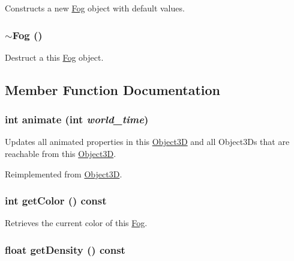 Constructs a new \hyperlink{classm3g_1_1Fog}{Fog} object with default values. \hypertarget{classm3g_1_1Fog_c13d77e65284ed8f7480c8f83ed9780f}{
\subsubsection[{$\sim$Fog}]{\setlength{\rightskip}{0pt plus 5cm}$\sim${\bf Fog} ()}}
\label{classm3g_1_1Fog_c13d77e65284ed8f7480c8f83ed9780f}


Destruct a this \hyperlink{classm3g_1_1Fog}{Fog} object. 

\subsection{Member Function Documentation}
\hypertarget{classm3g_1_1Fog_8aad1ceab4c2a03609c8a42324ce484d}{
\subsubsection[{animate}]{\setlength{\rightskip}{0pt plus 5cm}int animate (int {\em world\_\-time})}}
\label{classm3g_1_1Fog_8aad1ceab4c2a03609c8a42324ce484d}


Updates all animated properties in this \hyperlink{classm3g_1_1Object3D}{Object3D} and all Object3Ds that are reachable from this \hyperlink{classm3g_1_1Object3D}{Object3D}. 

Reimplemented from \hyperlink{classm3g_1_1Object3D_8aad1ceab4c2a03609c8a42324ce484d}{Object3D}.\hypertarget{classm3g_1_1Fog_4cfa1931c265ec3412fe3f6408a1b4f5}{
\subsubsection[{getColor}]{\setlength{\rightskip}{0pt plus 5cm}int getColor () const}}
\label{classm3g_1_1Fog_4cfa1931c265ec3412fe3f6408a1b4f5}


Retrieves the current color of this \hyperlink{classm3g_1_1Fog}{Fog}. \hypertarget{classm3g_1_1Fog_31deef556a6aa5e519d3c79bd9c383c0}{
\subsubsection[{getDensity}]{\setlength{\rightskip}{0pt plus 5cm}float getDensity () const}}
\label{classm3g_1_1Fog_31deef556a6aa5e519d3c79bd9c383c0}


